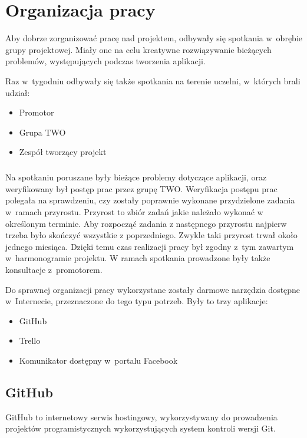 \chapter{Organizacja pracy}



Aby dobrze zorganizować pracę nad projektem, odbywały się spotkania w~obrębie grupy projektowej. Miały one na celu kreatywne rozwiązywanie bieżących problemów, występujących podczas tworzenia aplikacji. 

Raz w~tygodniu odbywały się także spotkania na terenie uczelni, w~których brali udział:
\begin{itemize}
\item Promotor
\item Grupa TWO
\item Zespół tworzący projekt
\end{itemize}

\paragraph{}
Na spotkaniu poruszane były bieżące problemy dotyczące aplikacji, oraz weryfikowany był postęp prac przez grupę TWO. Weryfikacja postępu prac polegała na sprawdzeniu, czy zostały poprawnie wykonane przydzielone zadania w~ramach przyrostu. Przyrost to zbiór zadań jakie należało wykonać w określonym terminie. Aby rozpocząć zadania z następnego przyrostu najpierw trzeba było skończyć wszystkie z poprzedniego. Zwykle taki przyrost trwał około jednego miesiąca. Dzięki temu czas realizacji pracy był zgodny z~tym zawartym w~harmonogramie projektu. W ramach spotkania prowadzone były także konsultacje z~promotorem.

Do sprawnej organizacji pracy wykorzystane zostały darmowe narzędzia dostępne w~Internecie, przeznaczone do tego typu potrzeb. Były to trzy aplikacje:
\begin{itemize}
\item GitHub
\item Trello
\item Komunikator dostępny w~portalu Facebook
\end{itemize}

\section{GitHub}
GitHub to internetowy serwis hostingowy, wykorzystywany do prowadzenia projektów programistycznych wykorzystujących system kontroli wersji Git. 


